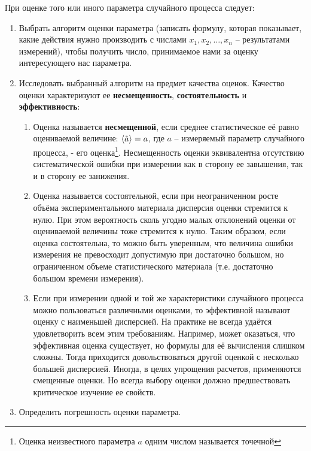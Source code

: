 \documentclass[a4paper,14pt]{extarticle}
\begin{document}
При оценке того или иного параметра случайного процесса следует:
\begin{enumerate}
    \item Выбрать алгоритм оценки параметра (записать формулу, которая показывает, какие действия нужно производить с числами $x_{1},x_{2},\dots,x_n$ -- результатами измерений), чтобы получить число, принимаемое нами за оценку интересующего нас параметра.
    \item Исследовать выбранный алгоритм на предмет качества оценок. Качество оценки характеризуют ее \textbf{несмещенность}, \textbf{состоятельность} и \textbf{эффективность}:
    \begin{enumerate}
        \item Оценка называется \textbf{несмещенной}, если среднее статистическое её равно оцениваемой величине:  $\langle\tilde a\rangle = a$, где $a$ -- измеряемый параметр случайного процесса,  - его оценка\footnote{Оценка неизвестного параметра $a$ одним числом называется точечной}. Несмещенность оценки эквивалентна отсутствию систематической ошибки при измерении как в сторону ее завышения, так и в сторону ее занижения.
    \item Оценка называется состоятельной, если при неограниченном росте объёма экспериментального материала дисперсия оценки стремится к нулю. При этом вероятность сколь угодно малых отклонений оценки от оцениваемой величины тоже стремится к нулю. Таким образом, если оценка состоятельна, то можно быть уверенным, что величина ошибки измерения не превосходит допустимую при достаточно большом, но ограниченном объеме статистического материала (т.е. достаточно большом времени измерения).
    \item Если при измерении одной и той же характеристики случайного процесса можно пользоваться различными оценками, то эффективной называют оценку с наименьшей дисперсией. На практике не всегда удаётся удовлетворить всем этим требованиям. Например, может оказаться, что эффективная оценка существует, но формулы для её вычисления слишком сложны. Тогда приходится довольствоваться другой оценкой с несколько большей дисперсией. Иногда, в целях упрощения расчетов, применяются смещенные оценки. Но всегда выбору оценки должно предшествовать критическое изучение ее свойств.
    \end{enumerate}
\item Определить погрешность оценки параметра. 
\end{enumerate}
\end{document}
